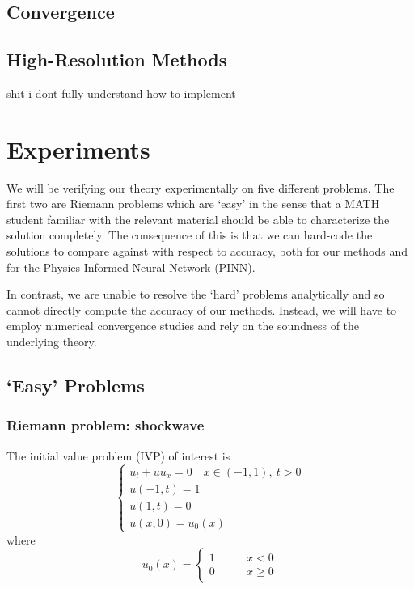 \documentclass{myproject}
\begin{document}
\subsection{Convergence}



\subsection{High-Resolution Methods}

shit i dont fully understand how to implement

\section{Experiments}

We will be verifying our theory experimentally on five different problems. The first two are Riemann problems which are `easy' in the sense that a MATH student familiar with the relevant material should be able to characterize the solution completely. The consequence of this is that we can hard-code the solutions to compare against with respect to accuracy, both for our methods and for the Physics Informed Neural Network (PINN).

In contrast, we are unable to resolve the `hard' problems analytically and so cannot directly compute the accuracy of our methods. Instead, we will have to employ numerical convergence studies and rely on the soundness of the underlying theory.

\subsection{`Easy' Problems}

\subsubsection{Riemann problem: shockwave}

The initial value problem (IVP) of interest is
\begin{equation}\label{IVP:shock}
    \begin{cases}
        u_t + uu_x = 0 \quad x \in (-1,1), \: t > 0 \\
        u(-1,t) = 1 \\
        u(1,t) = 0 \\
        u(x,0) = u_0(x)
    \end{cases} 
\end{equation}
where 
\begin{equation}
    u_0(x) = \begin{cases}
        1 \qquad & x < 0 \\
        0 \qquad & x \geq 0
    \end{cases}
\end{equation}
\end{document}
